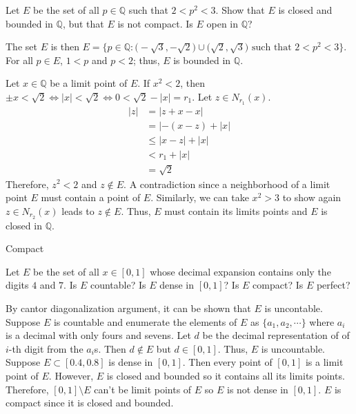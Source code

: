 \begin{exercise}
  Let \(E\) be the set of all \(p\in\mathbb{Q}\) such that \(2 < p^2 < 3\).
  Show that \(E\) is closed and bounded in \(\mathbb{Q}\), but that \(E\) is
  not compact.
  Is \(E\) open in \(\mathbb{Q}\)?
  \par\smallskip
  The set \(E\) is then
  \(E = \bigl\{p\in\mathbb{Q}\colon\bigl(-\sqrt{3},-\sqrt{2}\bigr)\cup
  \bigl(\sqrt{2},\sqrt{3}\bigr)\text{ such that } 2 < p^2 < 3\bigr\}\).
  For all \(p\in E\), \(1 < p\) and \(p < 2\); thus, \(E\) is bounded in \(\mathbb{Q}\).
  \par\smallskip
  Let \(x\in\mathbb{Q}\) be a limit point of \(E\).
  If \(x^2 < 2\), then \(\pm x < \sqrt{2}\iff\lvert x\rvert < \sqrt{2}\iff 0 < \sqrt{2} - \lvert x\rvert = r_1\).
  Let \(z\in N_{r_1}(x)\).
  \[
  	\begin{aligned}
		\lvert z\rvert &= \lvert z + x - x\rvert\\
		&= \lvert -(x - z) + \lvert x\rvert\\
		&\leq\lvert x - z\rvert + \lvert x\rvert\\
		&< r_1 + \lvert x\rvert\\
		&= \sqrt{2}
	\end{aligned}
  \]
  Therefore, \(z^2 < 2\) and \(z\not\in E\).
  A contradiction since a neighborhood of a limit point \(E\) must contain a point of \(E\).
  Similarly, we can take \(x^2 > 3\) to show again \(z\in N_{r_2}(x)\) leads to \(z\not\in E\).
  Thus, \(E\) must contain its limits points and \(E\) is closed in \(\mathbb{Q}\).
  \par\smallskip
  Compact
\item
  Let \(E\) be the set of all \(x\in[0,1]\) whose decimal expansion contains
  only the digits \(4\) and \(7\).
  Is \(E\) countable?
  Is \(E\) dense in \([0, 1]\)?
  Is \(E\) compact?
  Is \(E\) perfect?
  \par\smallskip
  By cantor diagonalization argument, it can be shown that \(E\) is uncontable.
  Suppose \(E\) is countable and enumerate the elements of \(E\) as
  \(\{a_1,a_2,\cdots\}\) where \(a_i\) is a decimal with only fours and sevens.
  Let \(d\) be the decimal representation of of \(i\)-th digit from the
  \(a_i\)s.
  Then \(d\not\in E\) but \(d\in[0,1]\).
  Thus, \(E\) is uncountable.
  Suppose \(E\subset [0.4,0.8]\) is dense in \([0,1]\).
  Then every point of \([0,1]\) is a limit point of \(E\).
  However, \(E\) is closed and bounded so it contains all its limits points.
  Therefore, \([0,1]\setminus E\) can't be limit points of \(E\) so \(E\)
  is not dense in \([0,1]\).
  \(E\) is compact since it is closed and bounded.

\end{exercise}
